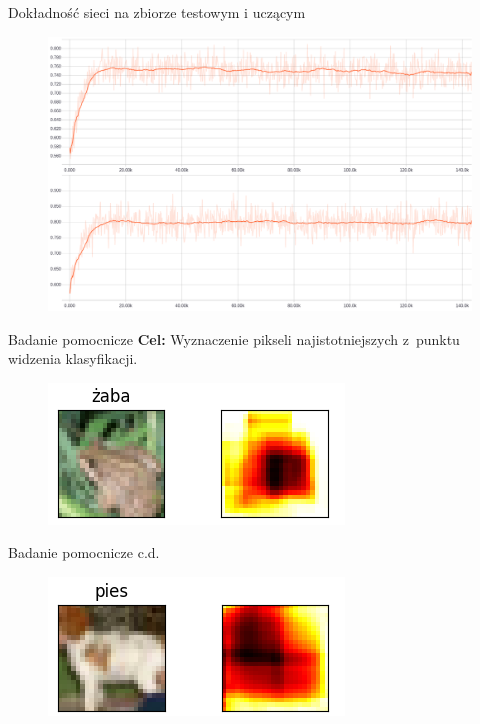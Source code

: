 \documentclass[xcolor=dvipsnames]{beamer}
\begin{document}
\begin{frame}{Dokładność sieci na zbiorze testowym i uczącym}
  \begin{figure}
    \includegraphics[width=\textwidth]{img/badanie_3.png}
  \end{figure}
\end{frame}
\begin{frame}{Badanie pomocnicze}
  \textbf{Cel:} Wyznaczenie pikseli najistotniejszych z~punktu widzenia klasyfikacji.
  \begin{figure}
    \includegraphics[width=\textwidth]{img/heatmap_1.png}
  \end{figure}
\end{frame}
\begin{frame}{Badanie pomocnicze c.d.}
  \begin{figure}
    \includegraphics[width=\textwidth]{img/heatmap_2.png}
  \end{figure}
\end{frame}
\end{document}
